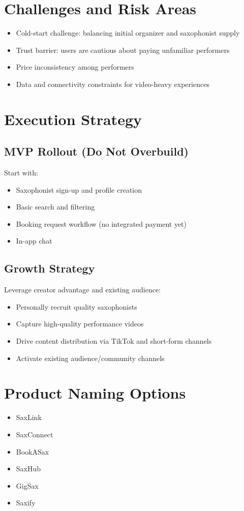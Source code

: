 \documentclass[11pt,a4paper]{article}
\begin{document}
\section{Challenges and Risk Areas}
\begin{itemize}[leftmargin=1.5em]
    \item Cold-start challenge: balancing initial organizer and saxophonist supply
    \item Trust barrier: users are cautious about paying unfamiliar performers
    \item Price inconsistency among performers
    \item Data and connectivity constraints for video-heavy experiences
\end{itemize}

\section{Execution Strategy}

\subsection{MVP Rollout (Do Not Overbuild)}
Start with:
\begin{itemize}[leftmargin=1.5em]
    \item Saxophonist sign-up and profile creation
    \item Basic search and filtering
    \item Booking request workflow (no integrated payment yet)
    \item In-app chat
\end{itemize}

\subsection{Growth Strategy}
Leverage creator advantage and existing audience:
\begin{itemize}[leftmargin=1.5em]
    \item Personally recruit quality saxophonists
    \item Capture high-quality performance videos
    \item Drive content distribution via TikTok and short-form channels
    \item Activate existing audience/community channels
\end{itemize}

\section{Product Naming Options}
\begin{itemize}[leftmargin=1.5em]
    \item SaxLink
    \item SaxConnect
    \item BookASax
    \item SaxHub
    \item GigSax
    \item Saxify
\end{itemize}
\end{document}
